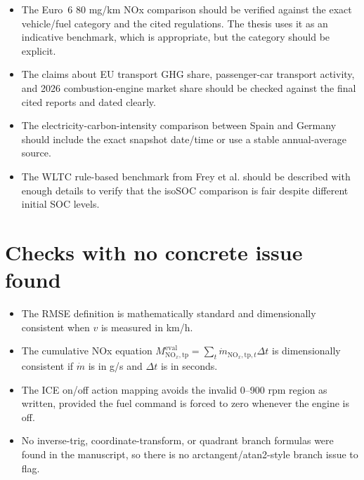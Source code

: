 \documentclass[11pt,a4paper]{article}
\begin{document}
\begin{itemize}
  \item The Euro~6 80 mg/km NOx comparison should be verified against the exact vehicle/fuel category and the cited regulations. The thesis uses it as an indicative benchmark, which is appropriate, but the category should be explicit.
  \item The claims about EU transport GHG share, passenger-car transport activity, and 2026 combustion-engine market share should be checked against the final cited reports and dated clearly.
  \item The electricity-carbon-intensity comparison between Spain and Germany should include the exact snapshot date/time or use a stable annual-average source.
  \item The WLTC rule-based benchmark from Frey et al. should be described with enough details to verify that the isoSOC comparison is fair despite different initial SOC levels.
\end{itemize}

\section*{Checks with no concrete issue found}

\begin{itemize}
  \item The RMSE definition is mathematically standard and dimensionally consistent when $v$ is measured in km/h.
  \item The cumulative NOx equation $M_{\mathrm{NO}_{x},\mathrm{tp}}^{\mathrm{eval}}=\sum_t \dot m_{\mathrm{NO}_{x},\mathrm{tp},t}\Delta t$ is dimensionally consistent if $\dot m$ is in g/s and $\Delta t$ is in seconds.
  \item The ICE on/off action mapping avoids the invalid 0--900 rpm region as written, provided the fuel command is forced to zero whenever the engine is off.
  \item No inverse-trig, coordinate-transform, or quadrant branch formulas were found in the manuscript, so there is no arctangent/atan2-style branch issue to flag.
\end{itemize}
\end{document}
